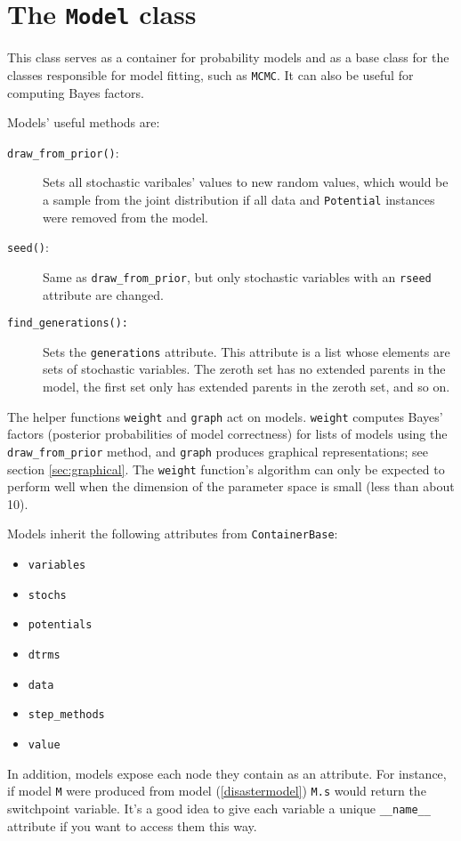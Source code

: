 \section{The \texttt{Model} class} \label{sec:Model}
This class serves as a container for probability models and as a base class for the classes responsible for model fitting, such as \texttt{MCMC}. It can also be useful for computing Bayes factors.

Models' useful methods are:
\begin{description}
    \item[\texttt{draw_from_prior()}:] Sets all stochastic varibales' values to new random values, which would be a sample from the joint distribution if all data and \texttt{Potential} instances were removed from the model.
    \item[\texttt{seed()}:] Same as \texttt{draw_from_prior}, but only stochastic variables with an \texttt{rseed} attribute are changed.
    \item[\texttt{find_generations():}] Sets the \texttt{generations} attribute. This attribute is a list whose elements are sets of stochastic variables. The zeroth set has no extended parents in the model, the first set only has extended parents in the zeroth set, and so on.
\end{description}

The helper functions \texttt{weight} and \texttt{graph} act on models. \texttt{weight} computes Bayes' factors (posterior probabilities of model correctness) for lists of models using the \texttt{draw_from_prior} method, and \texttt{graph} produces graphical representations; see section \ref{sec:graphical}. The \texttt{weight} function's algorithm can only be expected to perform well when the dimension of the parameter space is small (less than about 10).

Models inherit the following attributes from \texttt{ContainerBase}:
\begin{itemize}
    \item \texttt{variables}
    \item \texttt{stochs}
    \item \texttt{potentials}
    \item \texttt{dtrms}
    \item \texttt{data}
    \item \texttt{step_methods}
    \item \texttt{value}
\end{itemize}

In addition, models expose each node they contain as an attribute. For instance, if model \texttt{M} were produced from model (\ref{disastermodel}) \texttt{M.s} would return the switchpoint variable. It's a good idea to give each variable a unique \texttt{__name__} attribute if you want to access them this way.


